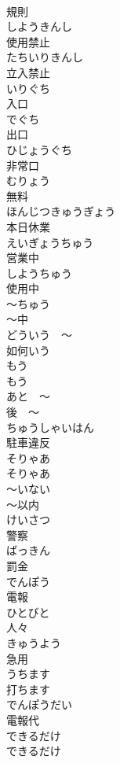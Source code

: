 \documentclass[8pt]{extreport}
\begin{document}
\begin{CJK}{UTF8}{min}
\\	規則	
\\	しようきんし	
\\	使用禁止	
\\	たちいりきんし	
\\	立入禁止	
\\	いりぐち	
\\	入口	
\\	でぐち	
\\	出口	
\\	ひじょうぐち	
\\	非常口	
\\	むりょう	
\\	無料		
\\	ほんじつきゅうぎょう	
\\	本日休業	
\\	えいぎょうちゅう	
\\	営業中	
\\	しようちゅう	
\\	使用中	
\\	〜ちゅう	
\\	〜中		
\\	どういう　〜	
\\	如何いう		
\\	もう 
\\	もう 
\\	あと　〜	
\\	後　〜		
\\	ちゅうしゃいはん	
\\	駐車違反		
\\	そりゃあ	
\\	そりゃあ		
\\	〜いない	
\\	〜以内		
\\	けいさつ	
\\	警察		
\\	ばっきん	
\\	罰金		
\\	でんぽう	
\\	電報		
\\	ひとびと	
\\	人々		
\\	きゅうよう	
\\	急用		
\\	うちます	
\\	打ちます		
\\	でんぽうだい	
\\	電報代		
\\	できるだけ	
\\	できるだけ		

\end{CJK}
\end{document}
